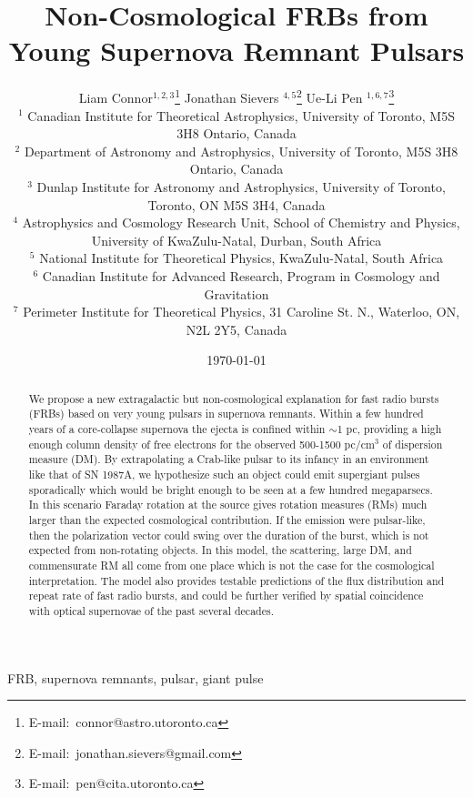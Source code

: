 \documentclass[useAMS,usenatbib]{mn2e}
\title{Non-Cosmological FRBs from Young Supernova Remnant Pulsars}
\author[Connor et al.]{
Liam Connor$^{1,2,3}$\thanks{E-mail:\ connor@astro.utoronto.ca}
Jonathan Sievers $^{4, 5}$\thanks{E-mail:\ jonathan.sievers@gmail.com}
Ue-Li Pen $^{1, 6, 7}$\thanks{E-mail:\ pen@cita.utoronto.ca}
\\
$^1$ Canadian Institute for Theoretical Astrophysics, University of Toronto, M5S 3H8 Ontario, Canada
\\
$^2$ Department of Astronomy and Astrophysics, University of Toronto, 
M5S 3H8 Ontario, Canada
\\
$^3$ Dunlap Institute for Astronomy and Astrophysics, University of Toronto,
Toronto, ON M5S 3H4, Canada
\\
$^4$ Astrophysics and Cosmology Research Unit, School of Chemistry and Physics, University of KwaZulu-Natal, Durban, South Africa
\\
$^5$ National Institute for Theoretical Physics, KwaZulu-Natal, South Africa
\\
$^6$ Canadian Institute for Advanced Research, Program in Cosmology
and Gravitation
\\
$^7$ Perimeter Institute for Theoretical Physics, 31 Caroline St. N., Waterloo, ON, N2L 2Y5, Canada
}
\begin{document}
\date{\today}
\pagerange{\pageref{firstpage}--\pageref{lastpage}} 
\maketitle
\label{firstpage}

\begin{abstract}

We  propose a new extragalactic but non-cosmological explanation for fast radio bursts 
(FRBs) based on
very young pulsars in supernova remnants. Within a few hundred years of a 
core-collapse supernova the ejecta 
is confined within $\sim$1 pc, providing a high enough column density of free electrons 
for the observed 500-1500 pc/cm$^3$ of dispersion measure (DM). By extrapolating a Crab-like pulsar to 
its infancy in an environment like that of SN 1987A, 
we hypothesize such an object could emit supergiant pulses sporadically which 
would be bright enough to be seen at a few hundred megaparsecs. In this scenario Faraday
rotation at the source gives rotation measures (RMs) much larger than the expected
cosmological contribution.  If the emission were pulsar-like, then the polarization 
vector could swing over the duration of the burst, which is not expected from 
non-rotating objects.
In this model, the scattering,
large DM, and commensurate RM all come from one place which is not the case for the cosmological
interpretation.  The model also provides
testable predictions of the flux distribution and repeat rate of fast radio bursts, and could be further
verified by spatial coincidence with optical supernovae of the past several decades. 
\end{abstract}
\begin{keywords}
FRB, supernova remnants, pulsar, giant pulse
\end{keywords}

\end{document}
